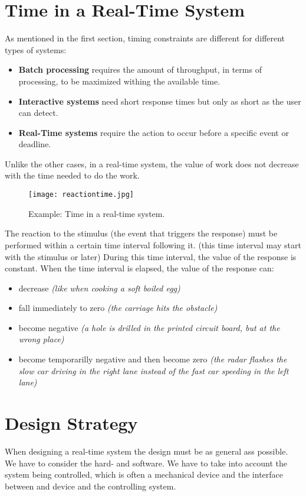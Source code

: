 \documentclass[../main.tex]{subfiles}
\begin{document}
\section{Time in a Real-Time System}
As mentioned in the first section, timing constraints are different for different types of systems:
\begin{itemize}
	\item \textbf{Batch processing} requires the amount of throughput, in terms of processing, to be maximized withing the available time.
	\item \textbf{Interactive systems} need short response times but only as short as the user can detect.
	\item \textbf{Real-Time systems} require the action to occur before a specific event or deadline.
\end{itemize}
Unlike the other cases, in a real-time system, the value of work does not decrease with the time needed to do the work. 

\begin{figure}[H]
    \centering
    \texttt{[image: reactiontime.jpg]}
    \caption{Example: Time in a real-time system.}
    \label{rttime}
\end{figure}
The reaction to the stimulus (the event that triggers the response) must be performed within a certain time interval following it. (this time interval may start with the stimulus or later) During this time interval, the value of the response is constant. When the time interval is elapsed, the value of the response can:
\begin{itemize}
	\item decrease \textit{(like when cooking a soft boiled egg)}
	\item fall immediately to zero \textit{(the carriage hits the obstacle)}
	\item become negative \textit{(a hole is drilled in the printed circuit board, but at the wrong place)}
	\item become temporarilly negative and then become zero\textit{ (the radar flashes the slow car driving in the right lane instead of the fast car speeding in the left lane)}
\end{itemize}

\section{Design Strategy}
When designing a real-time system the design must be as general ass possible. We have to consider the hard- and software. We have to take into account the system being controlled, which is often a mechanical device and the interface between and device and the controlling system.
\end{document}
